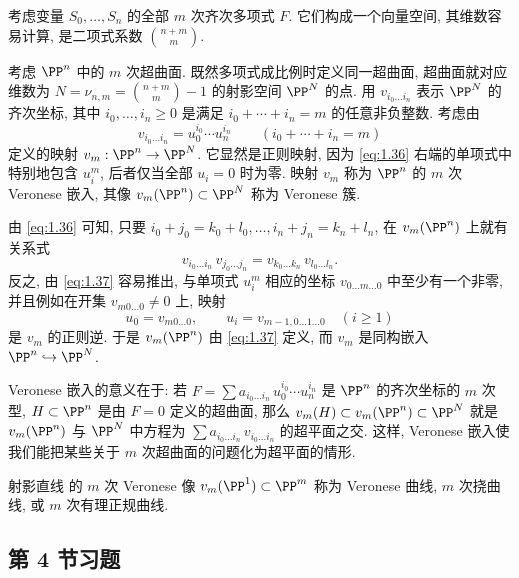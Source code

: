 \begin{example}[Veronese 嵌入]\label{exam:veronese}
	考虑变量 $S_0, \ldots, S_n$ 的全部 $m$ 次齐次多项式 $F$. 它们构成一个向量空间, 其维数容易计算, 是二项式系数 $\binom{n+m}{m}$.

	考虑 $\PP^n$ 中的 $m$ 次超曲面. 既然多项式成比例时定义同一超曲面, 超曲面就对应维数为 $N = \nu_{n,m} = \binom{n+m}{m} - 1$ 的射影空间 $\PP^N$ 的点. 用 $v_{i_0 \ldots i_n}$ 表示 $\PP^N$ 的齐次坐标, 其中 $i_0, \ldots, i_n \ge 0$ 是满足 $i_0 + \cdots + i_n = m$ 的任意非负整数. 考虑由
	\begin{equation}
		\label{eq:1.36}
		v_{i_0 \ldots i_n} = u_0^{i_0} \cdots u_n^{i_n} \qquad (i_0 + \cdots + i_n = m)
	\end{equation}
	定义的映射 $v_m: \PP^n \to \PP^N$. 它显然是正则映射, 因为 \eqref{eq:1.36} 右端的单项式中特别地包含 $u_i^m$, 后者仅当全部 $u_i = 0$ 时为零. 映射 $v_m$ 称为 $\PP^n$ 的 $m$ 次 Veronese 嵌入, 其像 $v_m(\PP^n) \subset \PP^N$ 称为 Veronese 簇.

	由 \eqref{eq:1.36} 可知, 只要 $i_0 + j_0 = k_0 + l_0, \ldots, i_n + j_n = k_n + l_n$, 在 $v_m(\PP^n)$ 上就有关系式
	\begin{equation}
		\label{eq:1.37}
		v_{i_0 \ldots i_n}\, v_{j_0 \ldots j_n} = v_{k_0 \ldots k_n}\, v_{l_0 \ldots l_n}.
	\end{equation}
	反之, 由 \eqref{eq:1.37} 容易推出, 与单项式 $u_i^m$ 相应的坐标 $v_{0 \ldots m \ldots 0}$ 中至少有一个非零, 并且例如在开集 $v_{m0 \ldots 0} \ne 0$ 上, 映射
	\[
		u_0 = v_{m0 \ldots 0}, \qquad u_i = v_{m-1, 0 \ldots 1 \ldots 0} \quad (i \ge 1)
	\]
	是 $v_m$ 的正则逆. 于是 $v_m(\PP^n)$ 由 \eqref{eq:1.37} 定义, 而 $v_m$ 是同构嵌入 $\PP^n \hookrightarrow \PP^N$.

	Veronese 嵌入的意义在于: 若 $F = \sum a_{i_0 \ldots i_n}\, u_0^{i_0} \cdots u_n^{i_n}$ 是 $\PP^n$ 的齐次坐标的 $m$ 次型, $H \subset \PP^n$ 是由 $F = 0$ 定义的超曲面, 那么 $v_m(H) \subset v_m(\PP^n) \subset \PP^N$ 就是 $v_m(\PP^n)$ 与 $\PP^N$ 中方程为 $\sum a_{i_0 \ldots i_n}\, v_{i_0 \ldots i_n}$ 的超平面之交. 这样, Veronese 嵌入使我们能把某些关于 $m$ 次超曲面的问题化为超平面的情形.

	射影直线 的 $m$ 次 Veronese 像 $v_m(\PP^1) \subset \PP^m$ 称为 Veronese 曲线, $m$ 次挠曲线, 或 $m$ 次有理正规曲线.
\end{example}

\subsection{第 4 节习题}

